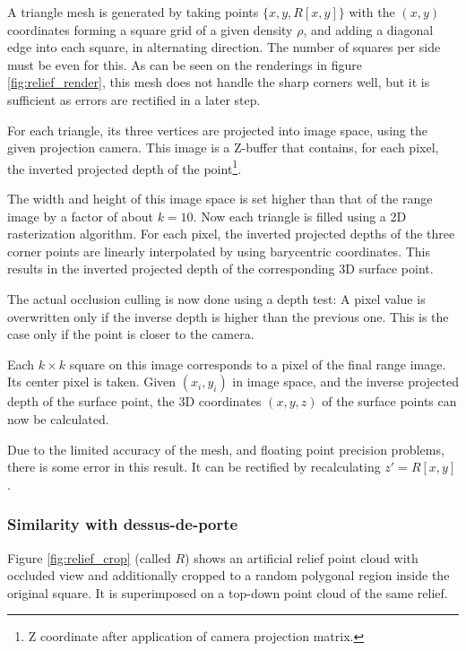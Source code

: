 A triangle mesh is generated by taking points $\{ x, y, R[x,y] \}$ with the $(x,y)$ coordinates forming a square grid of a given density $\rho$, and adding a diagonal edge into each square, in alternating direction. The number of squares per side must be even for this. As can be seen on the renderings in figure \ref{fig:relief_render}, this mesh does not handle the sharp corners well, but it is sufficient as errors are rectified in a later step.

For each triangle, its three vertices are projected into image space, using the given projection camera. This image is a Z-buffer that contains, for each pixel, the inverted projected depth of the point\footnote{Z coordinate after application of camera projection matrix.}.

The width and height of this image space is set higher than that of the range image by a factor of about $k = 10$. Now each triangle is filled using a 2D rasterization algorithm. For each pixel, the inverted projected depths of the three corner points are linearly interpolated by using barycentric coordinates. This results in the inverted projected depth of the corresponding 3D surface point.

The actual occlusion culling is now done using a depth test: A pixel value is overwritten only if the inverse depth is higher than the previous one. This is the case only if the point is closer to the camera.

Each $k \times k$ square on this image corresponds to a pixel of the final range image. Its center pixel is taken. Given $(x_i, y_i)$ in image space, and the inverse projected depth of the surface point, the 3D coordinates $(x, y, z)$ of the surface points can now be calculated.

Due to the limited accuracy of the mesh, and floating point precision problems, there is some error in this result. It can be rectified by recalculating $z' = R[x, y]$.

\subsubsection{Similarity with dessus-de-porte}
Figure \ref{fig:relief_crop} (called $R$) shows an artificial relief point cloud with occluded view and additionally cropped to a random polygonal region inside the original square. It is superimposed on a top-down point cloud of the same relief.


